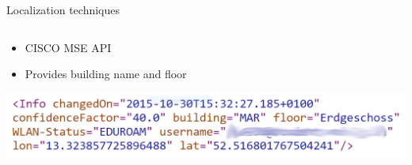 \documentclass[11pt]{beamer}
\begin{document}
\begin{frame}{Localization techniques}
\begin{columns}
\begin{column}{0.8\textwidth}
    \end{column}

  \end{columns}

  \vspace{0.5cm}

  \begin{itemize}
    \setlength{\itemsep}{1.5ex}
    \item CISCO MSE API
    \item Provides building name and floor
  \end{itemize}

  \vspace{0.25cm}

  \begin{center}
    \includegraphics[width=\textwidth]{tubitapi_response}
  \end{center}

\end{frame}
\end{document}
